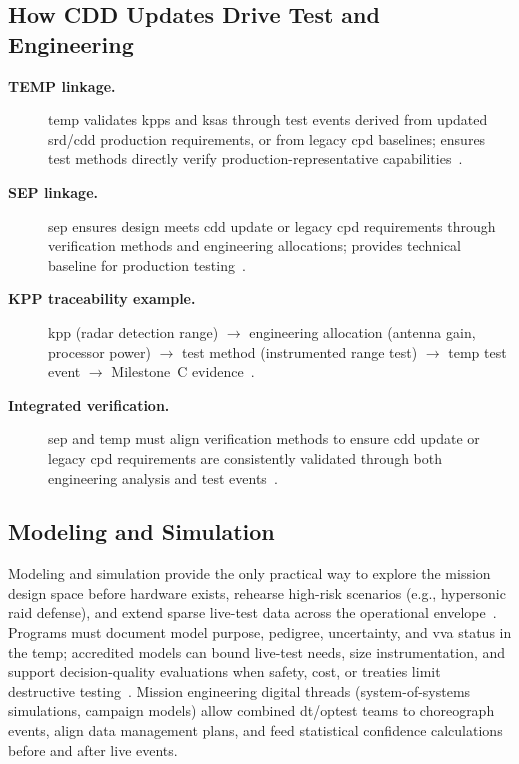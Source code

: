 \documentclass[../main.tex]{subfiles}
\begin{document}
\subsection{How CDD Updates Drive Test and Engineering}
\begin{description}
  \item[\textbf{TEMP linkage.}] \ac{temp} validates \acp{kpp} and \acp{ksa} through test events derived from updated \ac{srd}/\ac{cdd} production requirements, or from legacy \ac{cpd} baselines; ensures test methods directly verify production-representative capabilities~\autocite{DoDI5000-85,edo-3-3-3-jfrp-2026}.
  \item[\textbf{SEP linkage.}] \ac{sep} ensures design meets \ac{cdd} update or legacy \ac{cpd} requirements through verification methods and engineering allocations; provides technical baseline for production testing~\autocite{DoDI5000-88,edo-3-5-1-systems-engineering-overview-2025}.
  \item[\textbf{KPP traceability example.}] \ac{kpp} (radar detection range) $\rightarrow$ engineering allocation (antenna gain, processor power) $\rightarrow$ test method (instrumented range test) $\rightarrow$ \ac{temp} test event $\rightarrow$ Milestone~C evidence~\autocite{DoDI5000-85,edo-3-3-3-jfrp-2026}.
  \item[\textbf{Integrated verification.}] \ac{sep} and \ac{temp} must align verification methods to ensure \ac{cdd} update or legacy \ac{cpd} requirements are consistently validated through both engineering analysis and test events~\autocite{DoDI5000-88,DoDI5000-89}.
\end{description}

\subsection{Modeling and Simulation}
Modeling and simulation provide the only practical way to explore the mission design space before hardware exists, rehearse high-risk scenarios (e.g., hypersonic raid defense), and extend sparse live-test data across the operational envelope~\autocite{edo-3-5-5-test-eval-part-i-2025}. Programs must document model purpose, pedigree, uncertainty, and \ac{vva} status in the \ac{temp}; accredited models can bound live-test needs, size instrumentation, and support decision-quality evaluations when safety, cost, or treaties limit destructive testing~\autocite{DoDI5000-89}. Mission engineering digital threads (system-of-systems simulations, campaign models) allow combined \ac{dt}/\ac{optest} teams to choreograph events, align data management plans, and feed statistical confidence calculations before and after live events.
\end{document}
